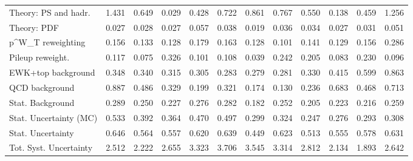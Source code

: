 \begin{tabular}{l|p{0.6cm}p{0.6cm}p{0.6cm}p{0.6cm}p{0.6cm}p{0.6cm}p{0.6cm}p{0.6cm}p{0.6cm}p{0.6cm}p{0.6cm}}
Theory: PS and hadr.                     & 1.431 & 0.649 & 0.029 & 0.428 & 0.722 & 0.861 & 0.767 & 0.550 & 0.138 & 0.459 & 1.256 \\
Theory: PDF                              & 0.027 & 0.028 & 0.027 & 0.057 & 0.038 & 0.019 & 0.036 & 0.034 & 0.027 & 0.031 & 0.051 \\
p^{W}_{T} reweighting                    & 0.156 & 0.133 & 0.128 & 0.179 & 0.163 & 0.128 & 0.101 & 0.141 & 0.129 & 0.156 & 0.286 \\
Pileup reweight.                         & 0.117 & 0.075 & 0.326 & 0.101 & 0.108 & 0.039 & 0.242 & 0.205 & 0.083 & 0.230 & 0.096 \\
EWK+top background                       & 0.348 & 0.340 & 0.315 & 0.305 & 0.283 & 0.279 & 0.281 & 0.330 & 0.415 & 0.599 & 0.863 \\
QCD background                           & 0.887 & 0.486 & 0.329 & 0.199 & 0.321 & 0.174 & 0.130 & 0.236 & 0.683 & 0.468 & 0.713 \\
Stat. Background                         & 0.289 & 0.250 & 0.227 & 0.276 & 0.282 & 0.182 & 0.252 & 0.205 & 0.223 & 0.216 & 0.259 \\
Stat. Uncertainty (MC)                   & 0.533 & 0.392 & 0.364 & 0.470 & 0.497 & 0.299 & 0.324 & 0.247 & 0.276 & 0.293 & 0.308 \\
\hline
Stat. Uncertainty                        & 0.646 & 0.564 & 0.557 & 0.620 & 0.639 & 0.449 & 0.623 & 0.513 & 0.555 & 0.578 & 0.631 \\
\hline
Tot. Syst. Uncertainty                   & 2.512 & 2.222 & 2.655 & 3.323 & 3.706 & 3.545 & 3.314 & 2.812 & 2.134 & 1.893 & 2.642 \\
\hline
\end{tabular}
